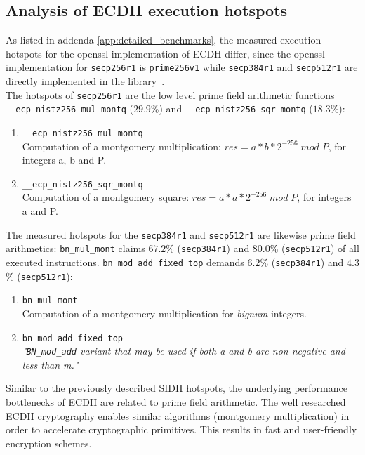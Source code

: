 \subsection{Analysis of \gls{ECDH} execution hotspots}

As listed in addenda \ref{app:detailed_benchmarks}, the measured execution hotspots for the \gls{openssl} implementation of \gls{ECDH} differ, since the \gls{openssl} implementation for \texttt{secp256r1} is \texttt{prime256v1} while \texttt{secp384r1} and \texttt{secp512r1} are directly implemented in the library~\parencite{turner2009elliptic}.\\
The hotspots of \texttt{secp256r1} are the low level prime field arithmetic functions \texttt{\_\_ecp\_nistz256\_mul\_montq} ($29.9$\%) and \texttt{\_\_ecp\_nistz256\_sqr\_montq} ($18.3$\%):
\begin{enumerate}
\item \texttt{\_\_ecp\_nistz256\_mul\_montq}\\Computation of a montgomery multiplication: $res = a*b*2^{-256}\;mod\;P$, for integers a, b and P.
\item \texttt{\_\_ecp\_nistz256\_sqr\_montq} \\Computation of a montgomery square: $res = a*a*2^{-256}\;mod\;P$, for integers a and P.
\end{enumerate}
The measured hotspots for the \texttt{secp384r1} and \texttt{secp512r1} are likewise prime field arithmetics: \texttt{bn\_mul\_mont} claims $67.2$\% (\texttt{secp384r1}) and $80.0$\% (\texttt{secp512r1}) of all executed instructions. \texttt{bn\_mod\_add\_fixed\_top} demands $6.2$\% (\texttt{secp384r1}) and $4.3$\% (\texttt{secp512r1}):
\begin{enumerate}
\item \texttt{bn\_mul\_mont}\\Computation of a montgomery multiplication for \textit{bignum} integers.
\item \texttt{bn\_mod\_add\_fixed\_top}\\\textit{"\texttt{BN\_mod\_add} variant that may be used if both a and b are non-negative and less than m."}
\end{enumerate}
Similar to the previously described \gls{SIDH} hotspots, the underlying performance bottlenecks of \gls{ECDH} are related to prime field arithmetic. The well researched \gls{ECDH} cryptography enables similar  algorithms (montgomery multiplication) in order to accelerate cryptographic primitives. This results in fast and user-friendly encryption schemes.
